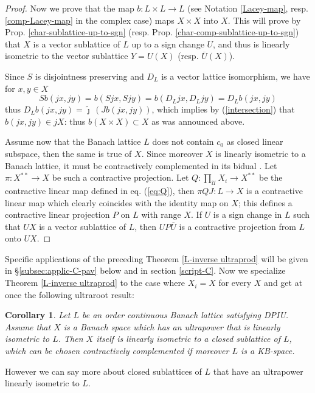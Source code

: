\documentclass[11pt]{amsart}
\theoremstyle{plain}
\newtheorem{corollary}[theorem]{Corollary}
\theoremstyle{remark}
\newcommand{\U}{\mathcal U}
\begin{document}
\begin{proof}
Now we prove that the map $b:L\times L\to L$ (see Notation \ref{Lacey-map}, resp. \ref{comp-Lacey-map} in the complex case) maps $X\times X$ into $X$. This will prove by Prop. \ref{char-sublattice-up-to-sgn} (resp. Prop. \ref{char-comp-sublattice-up-to-sgn}) that $X$ is a vector sublattice of $L$ up to a sign change $U$, and thus is linearly isometric to the vector sublattice $Y=U(X)$ (resp. $\overline U (X)$). 

Since $S$ is disjointness preserving and $D_L$ is a vector lattice isomorphism, we have for $x,y\in X$
\[Sb(jx,jy)= b(Sj x, Sj y)= b(D_L jx, D_L jy)= D_L b(jx,jy) \]
thus $D_L b(jx,jy) =\tilde\jmath\,  (J b(jx,jy))$, 
which implies by (\ref{intersection}) that $b(jx,jy)\in jX$: thus $b(X\times X)\subset X$ as was announced above.

Assume now that the Banach lattice $L$ does not contain $c_0$ as closed linear subspace, then the same is true of $X$. Since moreover $X$ is linearly isometric to a Banach lattice, it must be contractively complemented in its bidual \cite[Th. 1.c.4]{LT}. Let $\pi: X^{**}\to X$ be such a contractive projection. Let $Q:\prod_\U X_i\to X^{**}$ be the contractive linear map defined in eq. (\ref{eq:Q}), then $\pi QJ: L\to X$ is a contractive linear map which clearly coincides with the identity map on $X$; this defines a contractive linear projection $P$ on $L$ with range $X$. If $U$ is a sign change in $L$ such that $UX$ is a vector sublattice of $L$, then $UP\overline U$ is a contractive projection from $L$ onto $UX$.
\end{proof}

Specific applications of the preceding Theorem \ref{L-inverse ultraprod} will be given in \S  \ref{subsec:applic-C-pav} below and in section \ref{script-C}. Now we specialize Theorem  \ref{L-inverse ultraprod} to the case where $X_i=X$ for every $X$ and get at once the following ultraroot result:

\begin{corollary}\label{L-ultraroot} Let $L$ be an order continuous Banach lattice satisfying DPIU. Assume that $X$ is a Banach space which has an ultrapower that is linearly isometric to $L$. Then $X$ itself is linearly isometric to a closed sublattice of $L$, which can be chosen contractively complemented if moreover $L$ is a KB-space.
\end{corollary}

However we can say more about closed sublattices of $L$ that have an ultrapower linearly isometric to $L$.
\end{document}
